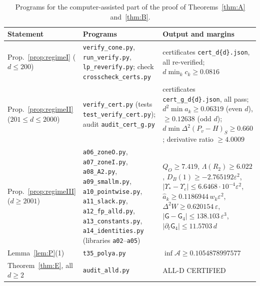 \documentclass[11pt]{amsart}
\theoremstyle{definition}
\theoremstyle{remark}
\numberwithin{equation}{section}
\begin{document}
\begin{table}[ht]
\small
\begin{tabular}{@{}>{\raggedright\arraybackslash}p{}>{\raggedright\arraybackslash}p{}>{\raggedright\arraybackslash}p{}@{}}
\toprule
Statement & Programs & Output and margins\\
\midrule
Prop.~\ref{prop:regimeI} ($d\le200$) & \texttt{verify\_cone.py}, \texttt{run\_verify.py}, \texttt{lp\_reverify.py};
check \texttt{crosscheck\_certs.py} & 199 certificates \texttt{cert\_d\{d\}.json}, all re-verified;
$d\min_kc_k\ge0.0816$\\
Prop.~\ref{prop:regimeII} ($201\le d\le2000$) & \texttt{verify\_cert.py} (tests \texttt{test\_verify\_cert.py}); audit
\texttt{audit\_cert\_g.py} & 1800 certificates \texttt{cert\_g\_d\{d\}.json}, all pass; $d^2\min\hat a_k\ge0.06319$ (even
$d$), $\ge0.12638$ (odd $d$); $d\min\Delta^2(P_v-H)_S\ge0.660$; derivative ratio $\ge4.0009$\\
Prop.~\ref{prop:regimeIII} ($d\ge2001$) & \texttt{a06\_zoneO.py}, \texttt{a07\_zoneI.py}, \texttt{a08\_A2.py},
\texttt{a09\_smallm.py}, \texttt{a10\_pointwise.py}, \texttt{a11\_slack.py}, \texttt{a12\_fp\_alld.py},
\texttt{a13\_constants.py}, \texttt{a14\_identities.py} (libraries \texttt{a02}--\texttt{a05}) & $Q_O\ge7.419$,
$\Lambda(R_2)\ge6.022$, $D_B(1)\ge-2.765192\varepsilon^2$, $|\Upsilon_*-\Upsilon_e|\le6.6468\cdot10^{-4}\varepsilon^2$,
$\hat a_k\ge0.1186944\,w_k\varepsilon^2$, $\Delta^2W\ge0.620154\,\varepsilon$, $|\mathsf G-\mathsf G_4|\le138.103\,\varepsilon^3$,
$|\partial_t\mathsf G_4|\le11.5703\,d$\\
Lemma~\ref{lem:P}(1) & \texttt{t35\_polya.py} & $\inf\mathcal A\ge0.1054878997577$\\
Theorem~\ref{thm:E}, all $d\ge2$ & \texttt{audit\_alld.py} & ALL-D CERTIFIED\\
\bottomrule
\end{tabular}
\caption{Programs for the computer-assisted part of the proof of Theorems~\ref{thm:A} and~\ref{thm:B}.}\label{tab:programs}
\end{table}
\end{document}
